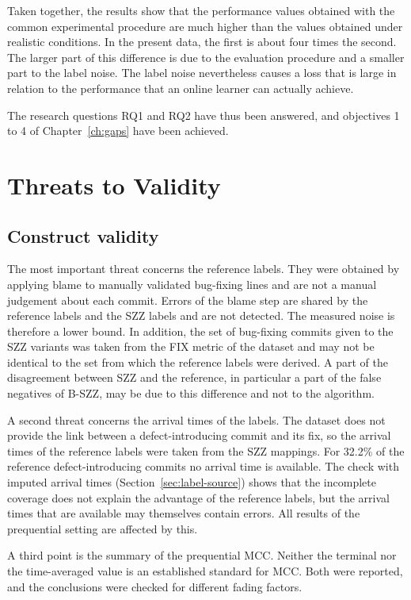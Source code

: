 \documentclass[12pt,a4paper,oneside]{report}
\begin{document}
Taken together, the results show that the performance values obtained with
the common experimental procedure are much higher than the values obtained
under realistic conditions. In the present data, the first is about four
times the second. The larger part of this difference is due to the evaluation
procedure and a smaller part to the label noise. The label noise nevertheless
causes a loss that is large in relation to the performance that an online
learner can actually achieve.

The research questions RQ1 and RQ2 have thus been answered, and objectives 1
to 4 of Chapter~\ref{ch:gaps} have been achieved.

\section{Threats to Validity}\label{sec:threats}

\subsection{Construct validity}

The most important threat concerns the reference labels. They were obtained
by applying blame to manually validated bug-fixing lines and are not a manual
judgement about each commit. Errors of the blame step are shared by the
reference labels and the SZZ labels and are not detected. The measured noise
is therefore a lower bound. In addition, the set of bug-fixing commits given
to the SZZ variants was taken from the FIX metric of the dataset and may not
be identical to the set from which the reference labels were derived. A part
of the disagreement between SZZ and the reference, in particular a part of
the false negatives of B-SZZ, may be due to this difference and not to the
algorithm.

A second threat concerns the arrival times of the labels. The dataset does
not provide the link between a defect-introducing commit and its fix, so the
arrival times of the reference labels were taken from the SZZ mappings. For
32.2\% of the reference defect-introducing commits no arrival time is
available. The check with imputed arrival times
(Section~\ref{sec:label-source}) shows that the incomplete coverage does not
explain the advantage of the reference labels, but the arrival times that are
available may themselves contain errors. All results of the prequential
setting are affected by this.

A third point is the summary of the prequential MCC. Neither the terminal
nor the time-averaged value is an established standard for MCC. Both were
reported, and the conclusions were checked for different fading factors.
\end{document}
